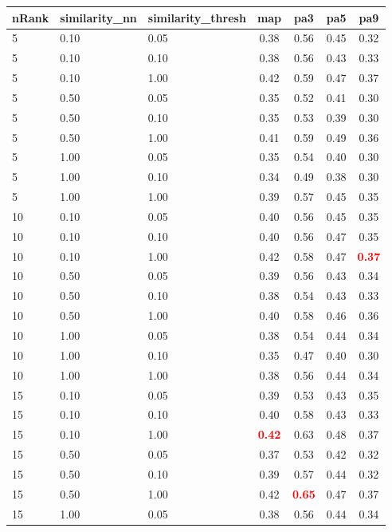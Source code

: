  
\begin{table} 
\begin{center} 
\scriptsize 
 \setlength{\tabcolsep}{.16667em} 
\begin{tabular}{lllcccc} 
nRank & similarity\_nn & similarity\_thresh & map & pa3 & pa5 & pa9 \\ 
\hline 
 5 & 0.10 & 0.05 & 0.38 & 0.56 & 0.45 & 0.32 \\ 
 5 & 0.10 & 0.10 & 0.38 & 0.56 & 0.43 & 0.33 \\ 
 5 & 0.10 & 1.00 & 0.42 & 0.59 & 0.47 & 0.37 \\ 
 5 & 0.50 & 0.05 & 0.35 & 0.52 & 0.41 & 0.30 \\ 
 5 & 0.50 & 0.10 & 0.35 & 0.53 & 0.39 & 0.30 \\ 
 5 & 0.50 & 1.00 & 0.41 & 0.59 & 0.49 & 0.36 \\ 
 5 & 1.00 & 0.05 & 0.35 & 0.54 & 0.40 & 0.30 \\ 
 5 & 1.00 & 0.10 & 0.34 & 0.49 & 0.38 & 0.30 \\ 
 5 & 1.00 & 1.00 & 0.39 & 0.57 & 0.45 & 0.35 \\ 
10 & 0.10 & 0.05 & 0.40 & 0.56 & 0.45 & 0.35 \\ 
10 & 0.10 & 0.10 & 0.40 & 0.56 & 0.47 & 0.35 \\ 
10 & 0.10 & 1.00 & 0.42 & 0.58 & 0.47 & \textbf{\textcolor{red}{0.37}} \\ 
10 & 0.50 & 0.05 & 0.39 & 0.56 & 0.43 & 0.34 \\ 
10 & 0.50 & 0.10 & 0.38 & 0.54 & 0.43 & 0.33 \\ 
10 & 0.50 & 1.00 & 0.40 & 0.58 & 0.46 & 0.36 \\ 
10 & 1.00 & 0.05 & 0.38 & 0.54 & 0.44 & 0.34 \\ 
10 & 1.00 & 0.10 & 0.35 & 0.47 & 0.40 & 0.30 \\ 
10 & 1.00 & 1.00 & 0.38 & 0.56 & 0.44 & 0.34 \\ 
15 & 0.10 & 0.05 & 0.39 & 0.53 & 0.43 & 0.35 \\ 
15 & 0.10 & 0.10 & 0.40 & 0.58 & 0.43 & 0.33 \\ 
15 & 0.10 & 1.00 & \textbf{\textcolor{red}{0.42}} & 0.63 & 0.48 & 0.37 \\ 
15 & 0.50 & 0.05 & 0.37 & 0.53 & 0.42 & 0.32 \\ 
15 & 0.50 & 0.10 & 0.39 & 0.57 & 0.44 & 0.32 \\ 
15 & 0.50 & 1.00 & 0.42 & \textbf{\textcolor{red}{0.65}} & 0.47 & 0.37 \\ 
15 & 1.00 & 0.05 & 0.38 & 0.56 & 0.44 & 0.34 \\ 

\end{tabular}
\end{center}
\end{table}
